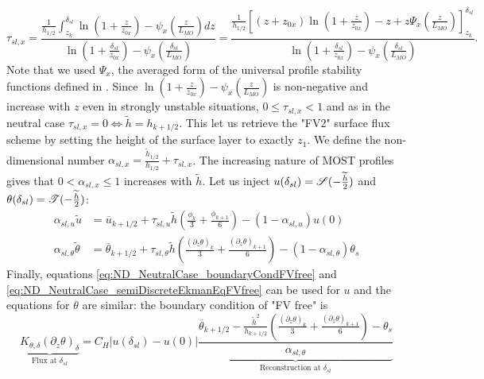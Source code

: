 \begin{equation}
\tau_{sl, x} = \frac{\frac{1}{{h_{1/2}}}\int_{z_k}^{\delta_{sl}} \ln(1+\frac{z}{z_{0x}})- \psi_x(\frac{z}{L_{MO}})
	dz}{\ln(1+\frac{\delta_{sl}}{z_{0x}})- \psi_x(\frac{\delta_{sl}}{L_{MO}})
    }
    =
 \frac{\frac{1}{{h_{1/2}}}
    \left[
	    (z+z_{0x})\ln(1+\frac{z}{z_{0x}})-z
    +
    z \Psi_x(\frac{z}{L_{MO}}) \right]_{z_k}^{\delta_{sl}}
    }{\ln(1+\frac{\delta_{sl}}{z_{0x}})- \psi_x(\frac{\delta_{sl}}{L_{MO}})
    }.
\end{equation}
Note that we used $\Psi_x$, the averaged form of the universal
profile stability functions defined in \citep{nishizawa_surface_2018}.
%
Since $\ln(1+\frac{z}{z_{0x}})-
\psi_x(\frac{z}{L_{MO}})$ is non-negative and increase with $z$ even
in strongly unstable situations,
$0 \leq \tau_{sl, x} < 1$ and as in the neutral case
$\tau_{sl, x}=0 \iff \widetilde{h}=h_{k+1/2}$. This let us retrieve
the "FV2" surface flux scheme by setting the height of the surface
layer to exactly $z_1$.
We define the non-dimensional number
$\alpha_{sl, x} = \frac{\widetilde{h}_{1/2}}{h_{1/2}} + \tau_{sl, x}$.
The increasing nature of MOST profiles gives that
$0 < \alpha_{sl, x} \leq 1$ increases with $\widetilde{h}$.
Let us inject $u(\delta_{sl}) =
{\cal S}(-\frac{\widetilde{h}}{2})$ and
$\theta(\delta_{sl}) = {\cal T}(-\frac{\widetilde{h}}{2})$:
\begin{equation}
\begin{aligned}
\label{eq:ND_StratifiedCase_relation_tilde_bar}
	\alpha_{sl, u}\widetilde{u} &= \overline{u}_{k+1/2} +
	\tau_{sl, u}
\widetilde{h}
	(\frac{\phi_k}{3} + \frac{\phi_{k+1}}{6})
	- (1- \alpha_{sl, u}) u(0)\\
\alpha_{sl, \theta}
\widetilde{\theta}
	&= \overline{\theta}_{k+1/2} + \tau_{sl, \theta}
	\widetilde{h}(\frac{{(\partial_z \theta)}_k}{3} + \frac{{(\partial_z \theta)}_{k+1}}{6})
 - (1 - \alpha_{sl, \theta})\theta_s
\end{aligned}
\end{equation}
Finally, equations \eqref{eq:ND_NeutralCase_boundaryCondFVfree} and
\eqref{eq:ND_NeutralCase_semiDiscreteEkmanEqFVfree} can be used for
$u$ and the equations for $\theta$ are similar:
the boundary condition of "FV free" is
\begin{equation}
	\label{eq:ND_StratifiedCase_semiDiscreteEkmanEqFVfree}
	\underbrace{K_{\theta, \delta} (\partial_z \theta)_\delta}_{
		\text{Flux at } \delta_{sl}
	} = 
	C_H |u(\delta_{sl})-u(0)|
	\underbrace{
	\frac{
  \overline{\theta}_{k+1/2} - \frac{\widetilde{h}^2}{h_{k+1/2}}
	(\frac{{(\partial_z \theta)}_k}{3} +
	\frac{{(\partial_z \theta)}_{k+1}}{6}) 
  - \theta_s
}{\alpha_{sl, \theta}}
	}_{\text{Reconstruction at } \delta_{sl}}
\end{equation}
